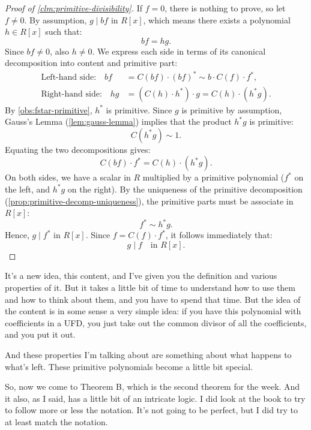 \begin{content}
\begin{proof}[Proof of \cref{clm:primitive-divisibility}]
If $f = 0$, there is nothing to prove, so let $f \neq 0$. By assumption, $g \mid bf$ in $R[x]$, which means there exists a polynomial $h \in R[x]$ such that:
\begin{equation}\label{eq:bf-hg}
bf = hg.
\end{equation}
Since $bf \neq 0$, also $h \neq 0$. We express each side in terms of its canonical decomposition into content and primitive part:
\begin{align*}
\text{Left-hand side:} \quad bf &= C(bf) \cdot (bf)^* \sim b \cdot C(f) \cdot f^*, \\
\text{Right-hand side:} \quad hg &= (C(h) \cdot h^*) \cdot g = C(h) \cdot (h^* g).
\end{align*}
By \cref{obs:fstar-primitive}, $h^*$ is primitive. Since $g$ is primitive by assumption, Gauss's Lemma (\cref{lem:gauss-lemma}) implies that the product $h^* g$ is primitive:
\[
C(h^* g) \sim 1.
\]
Equating the two decompositions gives:
\[
C(bf) \cdot f^* = C(h) \cdot (h^* g).
\]
On both sides, we have a scalar in $R$ multiplied by a primitive polynomial ($f^*$ on the left, and $h^* g$ on the right). By the uniqueness of the primitive decomposition (\cref{prop:primitive-decomp-uniqueness}), the primitive parts must be associate in $R[x]$:
\[
f^* \sim h^* g.
\]
Hence, $g \mid f^*$ in $R[x]$. Since $f = C(f) \cdot f^*$, it follows immediately that:
\[
g \mid f \quad \text{in } R[x].
\]
\end{proof}
\end{content}

\begin{speech}[00:19:24 - 00:20:34]
It's a new idea, this content, and I've given you the definition and various properties of it. But it takes a little bit of time to understand how to use them and how to think about them, and you have to spend that time. But the idea of the content is in some sense a very simple idea: if you have this polynomial with coefficients in a UFD, you just take out the common divisor of all the coefficients, and you put it out.

And these properties I'm talking about are something about what happens to what's left. These primitive polynomials become a little bit special.

So, now we come to Theorem B, which is the second theorem for the week. And it also, as I said, has a little bit of an intricate logic. I did look at the book to try to follow more or less the notation. It's not going to be perfect, but I did try to at least match the notation. 
\end{speech}

